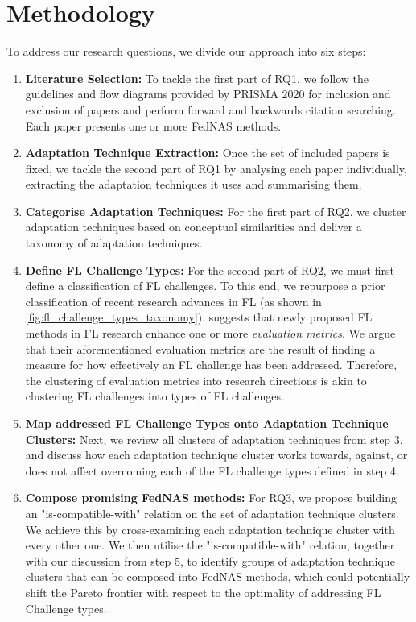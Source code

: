\section{Methodology}


To address our research questions, we divide our approach into six steps:

\begin{enumerate}
    \item \textbf{Literature Selection:} To tackle the first part of RQ1, we follow the guidelines and flow diagrams provided by PRISMA 2020 \cite{prisma_2020} for inclusion and exclusion of papers and perform forward and backwards citation searching. Each paper presents one or more FedNAS methods. 
    \item \textbf{Adaptation Technique Extraction:} Once the set of included papers is fixed, we tackle the second part of RQ1 by analysing each paper individually, extracting the adaptation techniques it uses and summarising them.
    \item \textbf{Categorise Adaptation Techniques:} For the first part of RQ2, we cluster adaptation techniques based on conceptual similarities and deliver a taxonomy of adaptation techniques.
    \item \textbf{Define FL Challenge Types:} For the second part of RQ2, we must first define a classification of FL challenges. To this end, we repurpose a prior classification \cite{fl_taxonomy_2024} of recent research advances in FL (as shown in \ref{fig:fl_challenge_types_taxonomy}). \cite{fl_taxonomy_2024} suggests that newly proposed FL methods in FL research enhance one or more \textit{evaluation metrics}. We argue that their aforementioned evaluation metrics are the result of finding a measure for how effectively an FL challenge has been addressed. Therefore, the clustering of evaluation metrics into research directions is akin to clustering FL challenges into types of FL challenges.
    \item \textbf{Map addressed FL Challenge Types onto Adaptation Technique Clusters:} Next, we review all clusters of adaptation techniques from step 3, and discuss how each adaptation technique cluster works towards, against, or does not affect overcoming each of the FL challenge types defined in step 4.
    \item \textbf{Compose promising FedNAS methods:} For RQ3, we propose building an "is-compatible-with" relation on the set of adaptation technique clusters. We achieve this by cross-examining each adaptation technique cluster with every other one. We then utilise the "is-compatible-with" relation, together with our discussion from step 5, to identify groups of adaptation technique clusters that can be composed into FedNAS methods, which could potentially shift the Pareto frontier with respect to the optimality of addressing FL Challenge types.
\end{enumerate}

